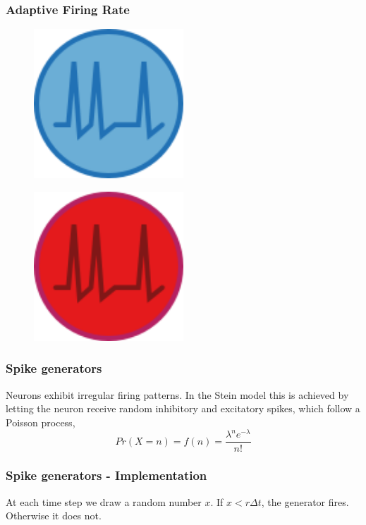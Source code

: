 \documentclass{beamer}
\begin{document}
\begin{frame}
	\frametitle{Adaptive Firing Rate}
	\begin{figure}
		\includegraphics[width = 0.5\textwidth]{figures/adaptive.png}
	\end{figure}
		\begin{figure}
	\includegraphics[width =0.5\textwidth]{figures/adaptive_inhibitory.png}
		\end{figure}
\end{frame}


\begin{frame}
	\frametitle{Spike generators}
	Neurons exhibit irregular firing patterns. In the Stein model this is achieved by letting the neuron receive random inhibitory and excitatory spikes, which follow a Poisson process, 
	  $$
	   Pr(X=n) = f(n) =  \frac{\lambda^n e^{-\lambda }}{n!}
	  $$
\end{frame}

\begin{frame}
	\frametitle{Spike generators - Implementation}
	At each time step we draw a random number $x$. If $x<r\Delta t$, the generator fires. Otherwise it does not. 
\end{frame}
\end{document}
